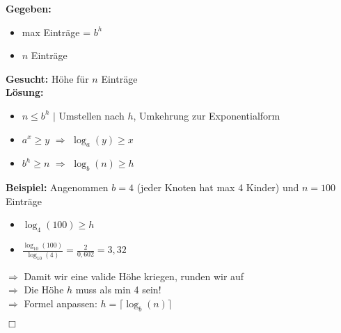 \noindent
\textbf{Gegeben:}
\begin{itemize}
	\item max Einträge = $b^h$
	\item $n$ Einträge
\end{itemize}
\textbf{Gesucht:} Höhe für $n$ Einträge\\
\textbf{Lösung:}
\begin{itemize}
	\item $n \leq b^h$ $|$ Umstellen nach $h$, Umkehrung zur Exponentialform
	\item $a^x \geq y$ $\Rightarrow$ $\log_{a}(y) \geq x$
	\item $b^h \geq n$ $\Rightarrow$ $\log_b(n) \geq h$
\end{itemize}
\textbf{Beispiel:} Angenommen $b=4$ (jeder Knoten hat max 4 Kinder) und $n=100$ Einträge
\begin{itemize}
	\item $\log_4(100) \geq h$
	\item $\frac{\log_10(100)}{\log_10(4)} = \frac{2}{0,602} = 3,32$
\end{itemize}
$\Rightarrow$ Damit wir eine valide Höhe kriegen, runden wir auf\\
$\Rightarrow$ Die Höhe $h$ muss als min 4 sein!\\
$\Rightarrow$ Formel anpassen: $h=\lceil \log_b(n) \rceil$
\begin{flushright}
$\Box$
\end{flushright}